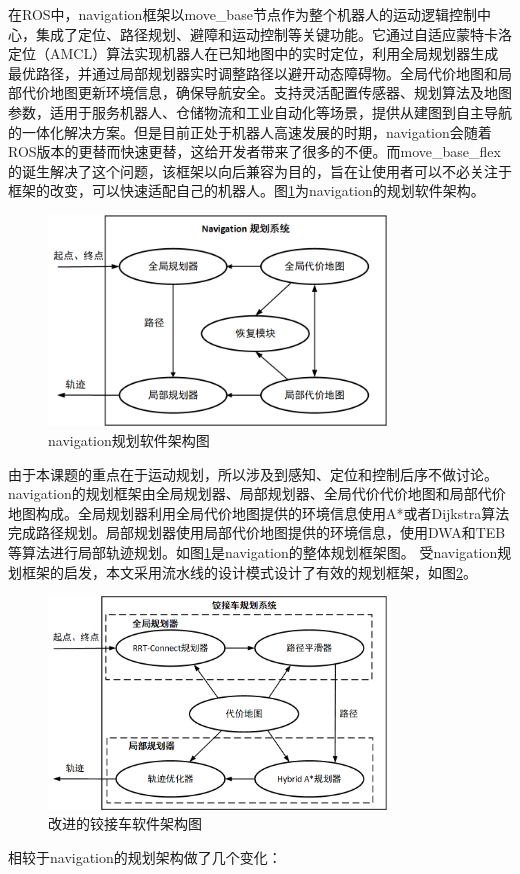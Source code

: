\documentclass[master,academic]{ysuthesis} %
\begin{document}
	在ROS中，navigation框架以move\_base节点作为整个机器人的运动逻辑控制中心，集成了定位、路径规划、避障和运动控制等关键功能。它通过自适应蒙特卡洛定位（​AMCL）算法实现机器人在已知地图中的实时定位，利用全局规划器生成最优路径，并通过局部规划器实时调整路径以避开动态障碍物。全局代价地图和局部代价地图更新环境信息，确保导航安全。支持灵活配置传感器、规划算法及地图参数，适用于服务机器人、仓储物流和工业自动化等场景，提供从建图到自主导航的一体化解决方案。但是目前正处于机器人高速发展的时期，navigation会随着ROS版本的更替而快速更替，这给开发者带来了很多的不便。而move\_base\_flex的诞生解决了这个问题，该框架以向后兼容为目的，旨在让使用者可以不必关注于框架的改变，可以快速适配自己的机器人。图\ref{fig:navigation规划框架图}为navigation的规划软件架构。
	\begin{figure}[!ht]
		\centering
		\includegraphics[width=0.8\textwidth]{navigation规划框架.png}
		\caption{navigation规划软件架构图}
		\label{fig:navigation规划框架图}
	\end{figure}
	
	由于本课题的重点在于运动规划，所以涉及到感知、定位和控制后序不做讨论。navigation的规划框架由全局规划器、局部规划器、全局代价代价地图和局部代价地图构成。全局规划器利用全局代价地图提供的环境信息使用A*或者Dijkstra算法完成路径规划。局部规划器使用局部代价地图提供的环境信息，使用DWA和TEB等算法进行局部轨迹规划。如图\ref{fig:navigation规划框架图}是navigation的整体规划框架图。
	受navigation规划框架的启发，本文采用流水线的设计模式设计了有效的规划框架，如图\ref{fig:改进的规划框架图}。
	\begin{figure}[!ht]
		\centering
		\includegraphics[width=0.8\textwidth]{我的规划框架.png}
		\caption{改进的铰接车软件架构图}
		\label{fig:改进的规划框架图}
	\end{figure}
	相较于navigation的规划架构做了几个变化：
\end{document}
